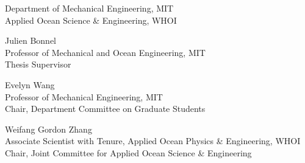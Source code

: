 \begin{titlepage}
\begin{center}
\begin{singlespace}
    \signature{Author}{\small Department of Mechanical Engineering, MIT \\ Applied Ocean Science \& Engineering, WHOI \\ \@date}
    \vspace{1em}
    \signature{Certified by}{Julien Bonnel \\ \small Professor of Mechanical and Ocean Engineering, MIT \\ Thesis Supervisor}
    \vspace{1em}
    \signature{Accepted by}{Evelyn Wang \\ \small Professor of Mechanical Engineering, MIT \\ Chair, Department Committee on Graduate Students}
    \vspace{1em}
    \signature{Accepted by}{Weifang Gordon Zhang \\ \small Associate Scientist with Tenure, Applied Ocean Physics \& Engineering, WHOI \\ Chair, Joint Committee for Applied Ocean Science \& Engineering}
    \end{singlespace}
  \end{center}
  \makeatother
\end{titlepage}

\newpage
\null
\thispagestyle{empty}
\newpage